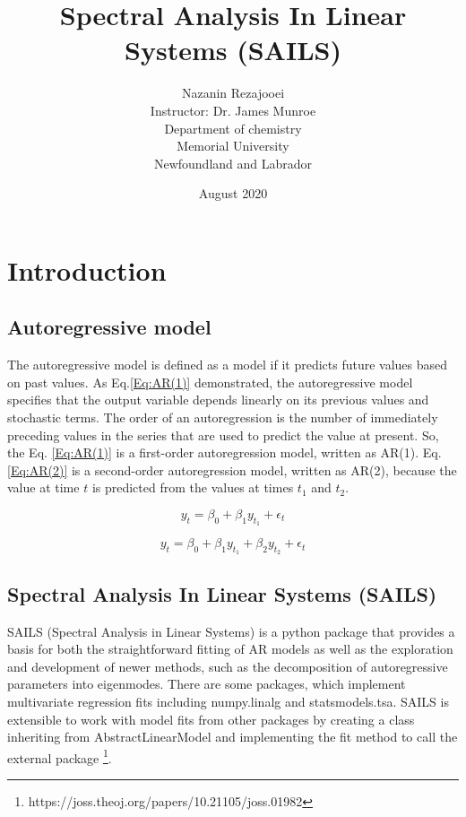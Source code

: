 \documentclass[12pt]{article}
\title {\textbf{Spectral Analysis In Linear Systems (SAILS)} \vspace{2 cm}}
\author{\huge \vspace{1.5 cm} Nazanin Rezajooei \\ \vspace{1 cm} Instructor: Dr. James Munroe \vspace{3 cm}\\  Department of chemistry \\ Memorial University \\ Newfoundland and Labrador}
\date{\vspace{1.5 cm}  August 2020}
\begin{document}
\maketitle
\newpage

\section{Introduction}
\subsection{Autoregressive model}

The autoregressive model is defined as a model if it predicts future values based on past values.
As Eq.\ref{Eq:AR(1)} demonstrated,  the autoregressive model specifies that the output variable depends linearly on its previous values and stochastic terms. The order of an autoregression is the number of immediately preceding values in the series that are used to predict the value at present. So, the Eq. \ref{Eq:AR(1)} is a first-order autoregression model, written as AR(1). Eq.\ref{Eq:AR(2)} is a second-order autoregression model, written as AR(2), because the value at time $t$ is predicted from the values at times $t_1$ and $t_2$.

\begin{equation}
    y_t = \beta_0 + \beta_1 y_{t_1} + \epsilon_t
    \label{Eq:AR(1)}
\end{equation}

\begin{equation}
    y_t = \beta_0 + \beta_1 y_{t_1} + \beta_2 y_{t_2} + \epsilon_t
    \label{Eq:AR(2)}
\end{equation}

\subsection{Spectral Analysis In Linear Systems (SAILS)}

SAILS (Spectral Analysis in Linear Systems) is a python package that provides a basis for both the straightforward fitting of AR models as well as the exploration and development of newer methods, such as the decomposition of autoregressive parameters into eigenmodes. There are some packages, which implement multivariate regression fits including numpy.linalg and statsmodels.tsa. SAILS is extensible to work with model fits from other packages by creating a class inheriting from AbstractLinearModel and implementing the fit method to call the external package \footnote{https://joss.theoj.org/papers/10.21105/joss.01982}.
\end{document}
